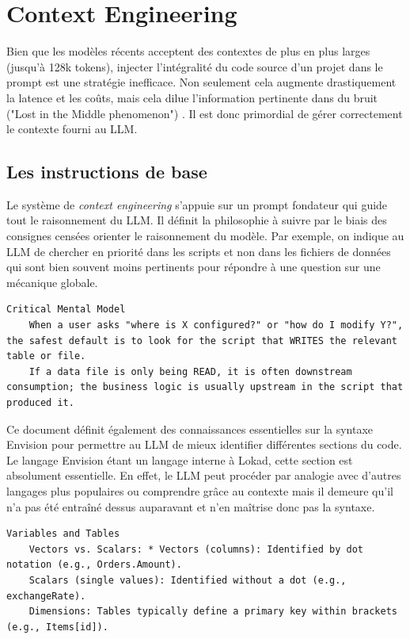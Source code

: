 \section{Context Engineering}
Bien que les modèles récents acceptent des contextes de plus en plus larges (jusqu'à 128k tokens), injecter l'intégralité du code source d'un projet dans le prompt est une stratégie inefficace. Non seulement cela augmente drastiquement la latence et les coûts, mais cela dilue l'information pertinente dans du bruit ("Lost in the Middle phenomenon") \cite{Liu2023}. Il est donc primordial de gérer correctement le contexte fourni au LLM.

\subsection{Les instructions de base}
Le système de \textit{context engineering} s'appuie sur un prompt fondateur qui guide tout le raisonnement du LLM. Il définit la philosophie à suivre par le biais des consignes censées orienter le raisonnement du modèle. Par exemple, on indique au LLM de chercher en priorité dans les scripts et non dans les fichiers de données qui sont bien souvent moins pertinents pour répondre à une question sur une mécanique globale.

\begin{lstlisting}
Critical Mental Model
    When a user asks "where is X configured?" or "how do I modify Y?", the safest default is to look for the script that WRITES the relevant table or file.
    If a data file is only being READ, it is often downstream consumption; the business logic is usually upstream in the script that produced it.
\end{lstlisting}

Ce document définit également des connaissances essentielles sur la syntaxe Envision pour permettre au LLM de mieux identifier différentes sections du code. Le langage Envision étant un langage interne à Lokad, cette section est absolument essentielle. En effet, le LLM peut procéder par analogie avec d'autres langages plus populaires ou comprendre grâce au contexte mais il demeure qu'il n'a pas été entraîné dessus auparavant et n'en maîtrise donc pas la syntaxe.

\begin{lstlisting}
Variables and Tables
    Vectors vs. Scalars: * Vectors (columns): Identified by dot notation (e.g., Orders.Amount).
    Scalars (single values): Identified without a dot (e.g., exchangeRate).
    Dimensions: Tables typically define a primary key within brackets (e.g., Items[id]).
\end{lstlisting}

